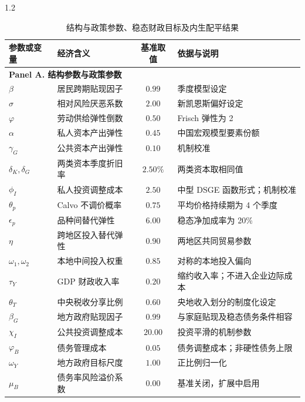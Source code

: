 \documentclass[12pt,UTF8]{ctexart}
\begin{document}
\begin{spacing}{1.2}
		\begin{table}[H]
			\centering
			\caption{结构与政策参数、稳态财政目标及内生配平结果}
			\label{tab:calibration}
			\footnotesize
			\setlength{\tabcolsep}{3pt}
			\begin{tabular}{p{}p{}cp{}}
				\toprule
				\textbf{参数或变量} & \textbf{经济含义} & \textbf{基准取值} & \textbf{依据与说明} \\
				\midrule
				\multicolumn{4}{l}{\textbf{Panel A. 结构参数与政策参数}} \\
				$\beta$ & 居民跨期贴现因子 & $0.99$ & 季度模型设定\cite{xu2019uncertainty} \\
				$\sigma$ & 相对风险厌恶系数 & $2.00$ & 新凯恩斯偏好设定\cite{wangxi2017} \\
				$\varphi$ & 劳动供给弹性倒数 & $0.50$ & Frisch 弹性为 2 \\
				$\alpha$ & 私人资本产出弹性 & $0.45$ & 中国宏观模型要素份额\cite{zhu2018} \\
				$\gamma_G$ & 公共资本产出弹性 & $0.10$ & 机制校准\cite{baxter1993,leeper2010} \\
				$\delta_K,\delta_G$ & 两类资本季度折旧率 & $2.50\%$ & 两类资本取相同值\cite{christiano2005,smetswouters2007} \\
				$\phi_I$ & 私人投资调整成本 & $2.50$ & 中型 DSGE 函数形式；机制校准 \\
				$\theta_p$ & Calvo 不调价概率 & $0.75$ & 平均价格持续期为 4 个季度 \\
				$\epsilon_p$ & 品种间替代弹性 & $6.00$ & 稳态净加成率为 20\%\cite{gali2015} \\
				$\eta$ & 跨地区投入替代弹性 & $0.90$ & 两地区共同贸易参数 \\
				$\omega_1,\omega_2$ & 本地中间投入权重 & $0.85$ & 对称的本地投入偏向 \\
				$\tau_Y$ & GDP 财政收入率 & $0.20$ & 缩约收入率；不进入企业边际成本 \\
				$\theta_T$ & 中央税收分享比例 & $0.60$ & 央地收入划分的制度化设定 \\
				$\beta_G$ & 地方政府贴现因子 & $0.99$ & 与家庭贴现及稳态债务条件相容 \\
				$\chi_I$ & 公共投资调整成本 & $20.00$ & 投资平滑的机制参数 \\
				$\varphi_B$ & 债务管理成本 & $0.05$ & 债务调整成本；非硬性债务上限 \\
				$\omega_Y$ & 地方政府目标尺度 & $1.00$ & 正比例归一化 \\
				$\mu_B$ & 债务率风险溢价系数 & $0.00$ & 基准关闭，扩展中启用 \\

\end{tabular}
\end{table}
\end{spacing}
\end{document}

